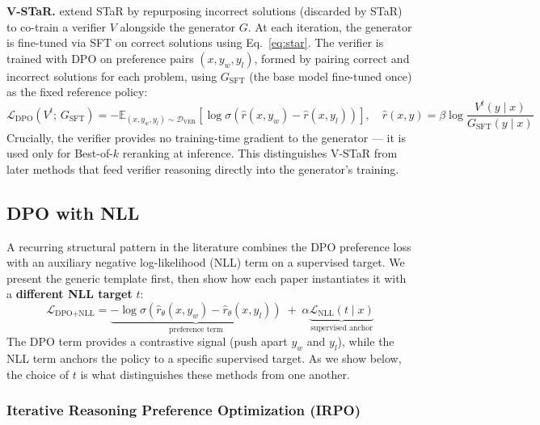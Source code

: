 \documentclass[11pt]{article}
\begin{document}
\textbf{V-STaR.} \autocite{hosseini2024vstartrainingverifiersselftaught} extend STaR by repurposing incorrect solutions (discarded by STaR) to co-train a verifier $V$ alongside the generator $G$. At each iteration, the generator is fine-tuned via SFT on correct solutions using Eq.~\eqref{eq:star}. The verifier is trained with DPO on preference pairs $(x, y_w, y_l)$, formed by pairing correct and incorrect solutions for each problem, using $G_{\text{SFT}}$ (the base model fine-tuned once) as the fixed reference policy:
\begin{equation}
    \mathcal{L}_{\text{DPO}}(V^t;\, G_{\text{SFT}}) = -\mathbb{E}_{(x, y_w, y_l) \sim \mathcal{D}_{\text{VER}}} \!\left[\log \sigma\!\left(\hat{r}(x, y_w) - \hat{r}(x, y_l)\right)\right], \quad \hat{r}(x, y) = \beta \log \frac{V^t(y \mid x)}{G_{\text{SFT}}(y \mid x)}
    \label{eq:vstar}
\end{equation}
Crucially, the verifier provides no training-time gradient to the generator --- it is used only for Best-of-$k$ reranking at inference. This distinguishes V-STaR from later methods that feed verifier reasoning directly into the generator's training.

\subsection{DPO with NLL}
\label{sec:dpo-nll}

A recurring structural pattern in the literature combines the DPO preference loss with an auxiliary negative log-likelihood (NLL) term on a supervised target. We present the generic template first, then show how each paper instantiates it with a \textbf{different NLL target} $t$:
\begin{equation}
    \mathcal{L}_{\text{DPO+NLL}} = \underbrace{-\log \sigma\!\left(\hat{r}_\theta(x, y_w) - \hat{r}_\theta(x, y_l)\right)}_{\text{preference term}} \;+\; \alpha \underbrace{\mathcal{L}_{\text{NLL}}(t \mid x)}_{\text{supervised anchor}}
    \label{eq:dpo_nll_template}
\end{equation}
The DPO term provides a contrastive signal (push apart $y_w$ and $y_l$), while the NLL term anchors the policy to a specific supervised target. As we show below, the choice of $t$ is what distinguishes these methods from one another.

\subsubsection{Iterative Reasoning Preference Optimization (IRPO)}
\label{sec:irpo}
\end{document}
